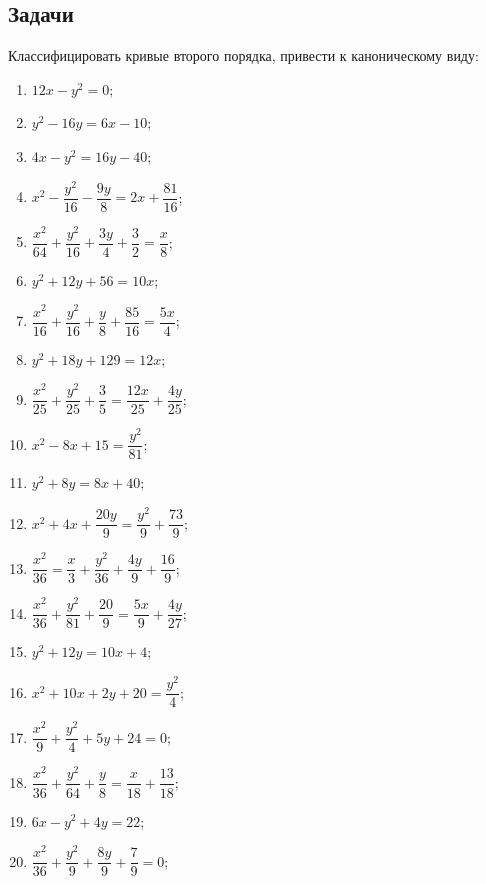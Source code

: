 \subsection{Задачи}

	Классифицировать кривые второго порядка, привести к каноническому виду:

	\begin{multicols}{2}
		\begin{enumerate}
			\setcounter{enumi}{\value{tasks}}

				\item \( 12x - y^2 = 0 \);
				\item \( y^2 - 16 y = 6x - 10 \);
				\item \( 4 x - y^2 = 16 y - 40 \);
				\item \( x^2 - \dfrac{y^2}{16} - \dfrac{9 y}{8} = 2x + \dfrac{81}{16} \);
				\item \( \dfrac{x^2}{64} + \dfrac{y^2}{16} + \dfrac{3 y}{4} + \dfrac{3}{2} = \dfrac{x}{8} \);
				\item \( y^2 + 12y + 56 = 10x \);
				\item \( \dfrac{x^2}{16} + \dfrac{y^2}{16} + \dfrac{y}{8} + \dfrac{85}{16} = \dfrac{5 x}{4} \);
				\item \( y^2 + 18 y + 129 = 12 x \);
				\item \( \dfrac{x^2}{25} + \dfrac{y^2}{25} + \dfrac{3}{5} = \dfrac{12 x}{25} + \dfrac{4 y}{25} \);
				\item \( x^2 - 8 x + 15 = \dfrac{y^2}{81} \);
				\item \( y^2 + 8y = 8x + 40 \);
				\item \( x^2 + 4 x + \dfrac{20 y}{9} = \dfrac{y^2}{9} + \dfrac{73}{9} \);
				\item \( \dfrac{x^2}{36} = \dfrac{x}{3} + \dfrac{y^2}{36} + \dfrac{4 y}{9} + \dfrac{16}{9} \);
				\item \( \dfrac{x^2}{36} + \dfrac{y^2}{81} + \dfrac{20}{9} = \dfrac{5 x}{9} + \dfrac{4 y}{27} \);
				\item \( y^2 + 12 y = 10 x + 4 \);
				\item \( x^2 + 10 x + 2 y + 20 = \dfrac{y^2}{4} \);
				\item \( \dfrac{x^2}{9} + \dfrac{y^2}{4} + 5 y + 24 = 0 \);
				\item \( \dfrac{x^2}{36} + \dfrac{y^2}{64} + \dfrac{y}{8} = \dfrac{x}{18} + \dfrac{13}{18} \);
				\item \( 6 x - y^2 + 4 y = 22 \);
				\item \( \dfrac{x^2}{36} + \dfrac{y^2}{9} + \dfrac{8 y}{9} + \dfrac{7}{9} = 0 \);

\end{enumerate}
\end{multicols}

